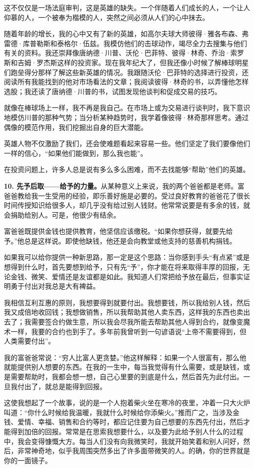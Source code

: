 这不仅仅是一场法庭审判，这是英雄的缺失。一个伴随着人们成长的人，一个让人仰慕的人，一个被奉为楷模的人，突然之间必须从人们的心中抹去。

随着年龄的增长，我的心中又有了新的英雄，如高尔夫球大师彼得·雅各布森、弗雷德·库普勒斯和泰格尔·伍兹。我模仿他们的击球动作，竭尽全力去搜集与他们有关的资料。我还崇拜像唐纳德·川普、沃伦·巴菲特、彼得·林奇、乔治·索罗斯和吉姆·罗杰斯这样的投资家。现在我年纪大了，但我还像小时候了解棒球明星们跑垒得分那样了解这些新英雄的情况。我跟随沃伦·巴菲特的选择进行投资，还阅读所有我能找到的他对市场看法的文章；我阅读彼得·林奇的书，以弄懂他怎样选股；我还读了唐纳德·川普的书，试图发现他谈判和促成交易的技巧。

就像在棒球场上一样，我不再是我自己。在市场上或为交易进行谈判时，我下意识地模仿川普的那种气势；当分析某种趋势时，我学着像彼得·林奇那样思考。通过偶像的模范作用，我们挖掘出自身的巨大潜能。

英雄人物不仅激励了我们，还会使难题看起来容易一些。他们坚定了我们要像他们一样的信心，“如果他们能做到，那么我也能”。

在投资问题上，许多人总是说有多么多么困难，而不去找能够“帮助”他们的英雄。

\textbf{10. 先予后取——给予的力量。}从某种意义上来说，我的两个爸爸都是老师。富爸爸教给我一生受用的经验，即乐善好施是必要的。受过良好教育的爸爸花了很长时间传授知识给很多人，却几乎没有给过别人钱财。他常常说要是有多余的钱，就会捐助给别人。可是，他很少有结余。

富爸爸既提供金钱也提供教育，他坚信应该缴税。“如果你想获得，就要先给予。”他总是这样说。即使他缺钱，他还是会向教堂或他支持的慈善机构捐钱。

如果我可以给你提供一种新思路，那一定是这个思路：当你感到手头“有点紧”或是想得到什么时，首先要想到给予，只有先“予”，你才能在将来取得丰厚的回报，无论金钱、微笑、爱情还是友谊都是如此。我知道人们常把给予放在最后，但事实证明勇于付出对我总是大有裨益。

我相信互利互惠的原则，我想要得到就要付出。我想要钱，所以我给别人钱，然后我又成倍地收回钱；我想做销售，所以我帮助其他人卖东西，这样我的东西也卖出去了；我需要签合约做生意，所以我会尽我所能去帮助其他人得到合约，就像变魔术一样，我要的合约也到手了。多年前我曾听到一句谚语说“上帝不需要得到，但人类需要付出”。

我的富爸爸常说：“穷人比富人更贪婪。”他这样解释：如果一个人很富有，那么他就能提供别人想要的东西。在我的一生中，每当我觉得有什么需要，或是缺钱，或是需要帮助时，我都会想一想，自己心里要的到底是什么，然后首先为此付出。一旦我付出了，就总是能得到回报。

这使我想起了一个故事，说的是一个人抱着柴火坐在寒冷的夜里，冲着一只大火炉叫道：“你什么时候给我温暖，我就什么时候给你添柴火。”推而广之，当涉及金钱、爱情、幸福、销售和合约等时，都应记住要为自己想要的东西先付出，然后才能得到加倍的回报。常常是在思索我想要什么，以及要为此给予别人什么的过程中，我会变得慷慨大方。每当人们没有向我微笑时，我就开始笑着和别人问好，然后，非常神奇地，似乎我周围突然多出了许多面带微笑的人。的确，你的世界就是你的一面镜子。

